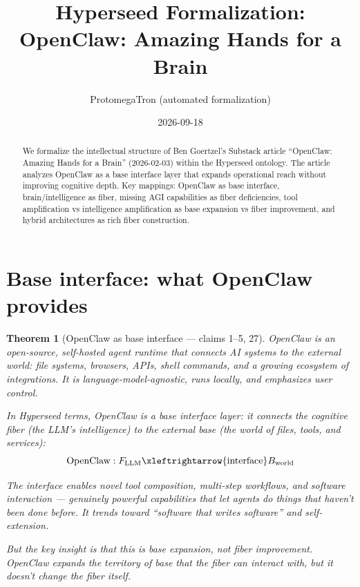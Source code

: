 \documentclass[11pt,a4paper]{article}
\title{Hyperseed Formalization:\\
  OpenClaw: Amazing Hands for a Brain}
\author{ProtomegaTron (automated formalization)}
\date{2026-09-18}
\newtheorem{theorem}[definition]{Theorem}
\begin{document}
\maketitle

\begin{abstract}
We formalize the intellectual structure of Ben Goertzel's Substack article
``OpenClaw: Amazing Hands for a Brain'' (2026-02-03) within the Hyperseed
ontology. The article analyzes OpenClaw as a base interface layer that
expands operational reach without improving cognitive depth. Key mappings:
OpenClaw as base interface, brain/intelligence as fiber, missing AGI
capabilities as fiber deficiencies, tool amplification vs intelligence
amplification as base expansion vs fiber improvement, and hybrid
architectures as rich fiber construction.
\end{abstract}

\tableofcontents

\section{Base interface: what OpenClaw provides}
\label{sec:base}

\begin{theorem}[OpenClaw as base interface --- claims 1--5, 27]
\label{thm:base}
OpenClaw is an open-source, self-hosted agent runtime that connects AI
systems to the external world: file systems, browsers, APIs, shell
commands, and a growing ecosystem of integrations. It is language-model-agnostic,
runs locally, and emphasizes user control.

In Hyperseed terms, OpenClaw is a \emph{base interface layer}: it connects
the cognitive fiber (the LLM's intelligence) to the external base (the
world of files, tools, and services):
\[
  \text{OpenClaw}: F_{\text{LLM}} \xleftrightarrow{\text{interface}}
  B_{\text{world}}
\]

The interface enables novel tool composition, multi-step workflows, and
software interaction --- genuinely powerful capabilities that let agents
do things that haven't been done before. It trends toward ``software that
writes software'' and self-extension.

But the key insight is that this is \emph{base expansion}, not
\emph{fiber improvement}. OpenClaw expands the territory of base that the
fiber can interact with, but it doesn't change the fiber itself.
\end{theorem}
\end{document}
